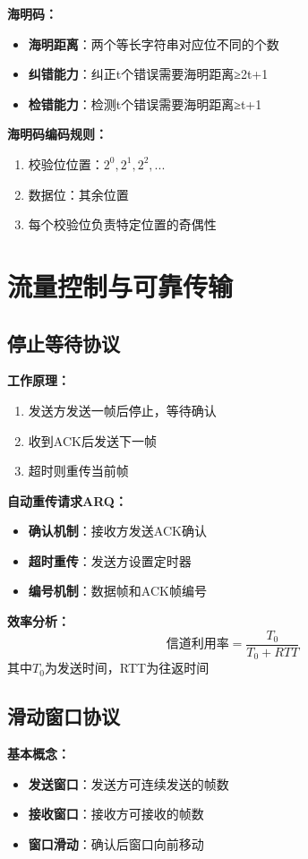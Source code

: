 \documentclass[lang=cn,newtx,10pt,scheme=chinese]{../../elegantbook}
\begin{document}
\textbf{海明码：}
\begin{itemize}
  \item \textbf{海明距离}：两个等长字符串对应位不同的个数
  \item \textbf{纠错能力}：纠正t个错误需要海明距离≥2t+1
  \item \textbf{检错能力}：检测t个错误需要海明距离≥t+1
\end{itemize}

\textbf{海明码编码规则：}
\begin{enumerate}
  \item 校验位位置：$2^0, 2^1, 2^2, ...$
  \item 数据位：其余位置
  \item 每个校验位负责特定位置的奇偶性
\end{enumerate}

\section{流量控制与可靠传输}

\subsection{停止等待协议}

\textbf{工作原理：}
\begin{enumerate}
  \item 发送方发送一帧后停止，等待确认
  \item 收到ACK后发送下一帧
  \item 超时则重传当前帧
\end{enumerate}

\textbf{自动重传请求ARQ：}
\begin{itemize}
  \item \textbf{确认机制}：接收方发送ACK确认
  \item \textbf{超时重传}：发送方设置定时器
  \item \textbf{编号机制}：数据帧和ACK帧编号
\end{itemize}

\textbf{效率分析：}
\[
\text{信道利用率} = \frac{T_0}{T_0 + RTT}
\]
其中$T_0$为发送时间，RTT为往返时间

\subsection{滑动窗口协议}

\textbf{基本概念：}
\begin{itemize}
  \item \textbf{发送窗口}：发送方可连续发送的帧数
  \item \textbf{接收窗口}：接收方可接收的帧数
  \item \textbf{窗口滑动}：确认后窗口向前移动
\end{itemize}
\end{document}
